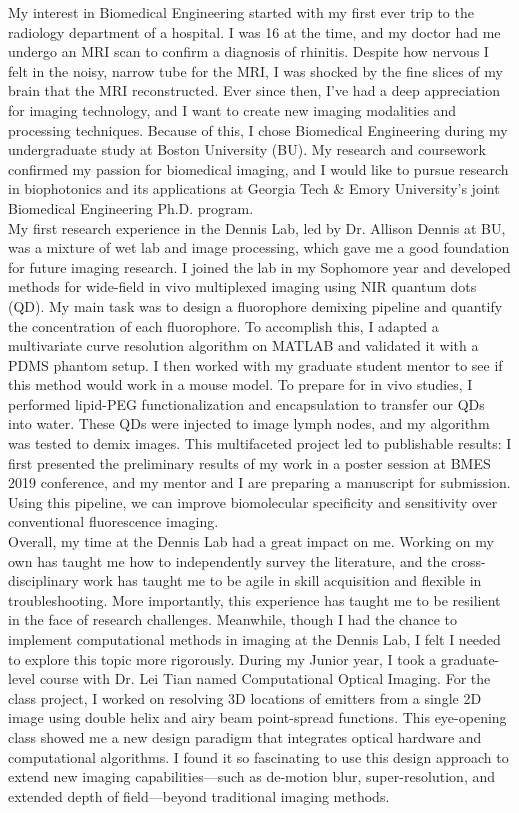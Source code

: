 \documentclass[12pt]{article}
\begin{document}
My interest in Biomedical Engineering started with my first ever trip to the radiology department of a hospital. I was 16 at the time, and my doctor had me undergo an MRI scan to confirm a diagnosis of rhinitis. Despite how nervous I felt in the noisy, narrow tube for the MRI, I was shocked by the fine slices of my brain that the MRI reconstructed. Ever since then, I've had a deep appreciation for imaging technology, and I want to create new imaging modalities and processing techniques. Because of this, I chose Biomedical Engineering during my undergraduate study at Boston University (BU). My research and coursework confirmed my passion for biomedical imaging, and I would like to pursue research in biophotonics and its applications at Georgia Tech \& Emory University's joint Biomedical Engineering Ph.D. program.
\\

My first research experience in the Dennis Lab, led by Dr. Allison Dennis at BU, was a mixture of wet lab and image processing, which gave me a good foundation for future imaging research. I joined the lab in my Sophomore year and developed methods for wide-field in vivo multiplexed imaging using NIR quantum dots (QD). My main task was to design a fluorophore demixing pipeline and quantify the concentration of each fluorophore. To accomplish this, I adapted a multivariate curve resolution algorithm on MATLAB and validated it with a PDMS phantom setup. I then worked with my graduate student mentor to see if this method would work in a mouse model. To prepare for in vivo studies, I performed lipid-PEG functionalization and encapsulation to transfer our QDs into water. These QDs were injected to image lymph nodes, and my algorithm was tested to demix images. This multifaceted project led to publishable results: I first presented the preliminary results of my work in a poster session at BMES 2019 conference, and my mentor and I are preparing a manuscript for submission. Using this pipeline, we can improve biomolecular specificity and sensitivity over conventional fluorescence imaging.
\\

Overall, my time at the Dennis Lab had a great impact on me. Working on my own has taught me how to independently survey the literature, and the cross-disciplinary work has taught me to be agile in skill acquisition and flexible in troubleshooting. More importantly, this experience has taught me to be resilient in the face of research challenges. Meanwhile, though I had the chance to implement computational methods in imaging at the Dennis Lab, I felt I needed to explore this topic more rigorously. During my Junior year, I took a graduate-level course with Dr. Lei Tian named Computational Optical Imaging. For the class project, I worked on resolving 3D locations of emitters from a single 2D image using double helix and airy beam point-spread functions. This eye-opening class showed me a new design paradigm that integrates optical hardware and computational algorithms. I found it so fascinating to use this design approach to extend new imaging capabilities—such as de-motion blur, super-resolution, and extended depth of field—beyond traditional imaging methods.
\\
\end{document}
